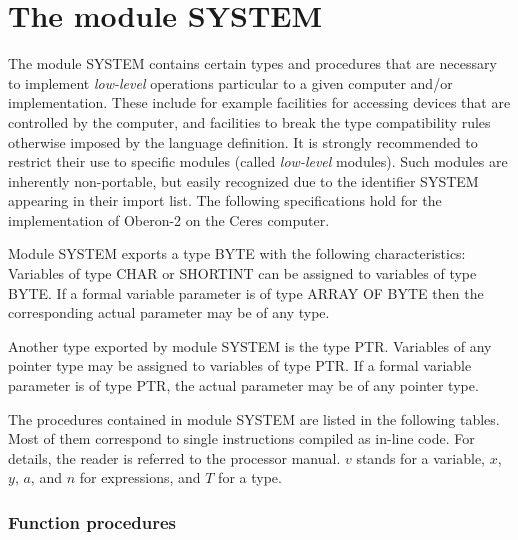 \section{The module SYSTEM}\label{o2r:SYSTEM}

The module SYSTEM contains certain types and procedures that are necessary
to implement {\em low-level} operations particular to a given computer and/or
implementation. These include for example facilities for accessing
devices that are controlled by the computer, and facilities to break
the type compatibility rules otherwise imposed by the language definition.
It is strongly recommended to restrict their use to specific modules
(called {\em low-level} modules). Such modules are inherently non-portable,
but easily recognized due to the identifier SYSTEM appearing in their
import list. The following specifications hold for the implementation
of Oberon-2 on the Ceres computer.

Module SYSTEM exports a type BYTE with the following characteristics:
Variables of type CHAR or SHORTINT can be assigned to variables of
type BYTE. If a formal variable parameter is of type ARRAY OF BYTE
then the corresponding actual parameter may be of any type.

Another type exported by module SYSTEM is the type PTR. Variables
of any pointer type may be assigned to variables of type PTR. If a
formal variable parameter is of type PTR, the actual parameter may
be of any pointer type.

The procedures contained in module SYSTEM are listed in the following
tables. Most of them correspond to single instructions compiled as
in-line code. For details, the reader is referred to the processor
manual. $v$ stands for a variable, $x$, $y$, $a$, and $n$ for expressions, and
$T$ for a type.

\subsubsection{Function procedures}

